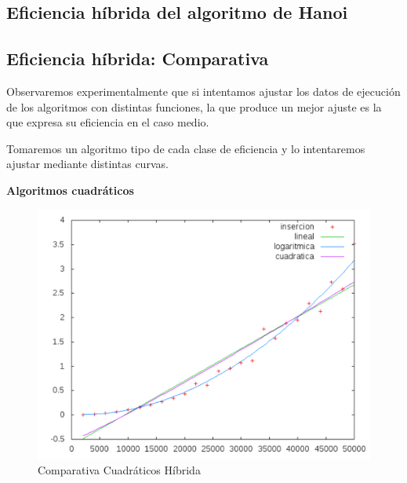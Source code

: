 \documentclass[a4paper, 11pt]{article}
\begin{document}
\subsection{Eficiencia híbrida del algoritmo de Hanoi}
\noindent{}

\newpage
\subsection{Eficiencia híbrida: Comparativa}

Observaremos experimentalmente que si intentamos ajustar los datos de ejecución de los algoritmos con distintas funciones, la que produce un mejor ajuste es la que expresa su eficiencia en el caso medio.

Tomaremos un algoritmo tipo de cada clase de eficiencia y lo intentaremos ajustar mediante distintas curvas.

\vspace{1cm}
\textbf{Algoritmos cuadráticos}

\begin{figure}[H]\includegraphics[width=13cm]{img/cuad_hibrida.pdf} \centering
	\caption{Comparativa Cuadráticos Híbrida}\end{figure}
\end{document}
